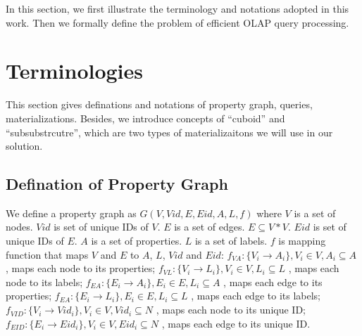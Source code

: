 In this section, we first illustrate the terminology and notations adopted in this work. Then we formally define the problem of efficient OLAP query processing. 

\section{Terminologies}

This section gives definations and notations of property graph, queries, materializations. Besides, we introduce concepts of ``cuboid'' and ``subsubstrcutre'', which are two types of materializaitons we will use in our solution. 

\subsection{Defination of Property Graph}
We define a property graph as $G(V, Vid, E, Eid, A, L, f)$ where  $V$ is a set of nodes. $Vid$ is set of unique IDs of $V$. $E$ is a set of edges. $E \subseteq V * V$. $Eid$ is set of unique IDs of $E$. $A$ is a set of properties. $L$ is a set of labels. $f$ is mapping function that maps $V$ and $E$ to $A$, $L$, $Vid$ and $Eid$: $f_{VA}: \{V_{i} \rightarrow A_{i}\}, V_{i}\in V, A_{i} \subseteq A$ , maps each node to its properties; $f_{VL}: \{V_{i} \rightarrow L_{i}\}, V_{i}\in V, L_{i} \subseteq L$ , maps each node to its labels; $f_{EA}: \{E_{i} \rightarrow A_{i}\}, E_{i}\in E, L_{i} \subseteq A$ , maps each edge to its properties; $f_{EA}: \{E_{i} \rightarrow L_{i}\}, E_{i}\in E, L_{i} \subseteq L$ , maps each edge to its labels; $f_{VID}: \{V_{i} \rightarrow Vid_{i}\}, V_{i}\in V, Vid_{i} \subseteq N$ , maps each node to its unique ID; $f_{EID}: \{E_{i} \rightarrow Eid_{i}\}, V_{i}\in V, Eid_{i} \subseteq N$ , maps each edge to its unique ID.

%
%
%
%
%
%
%

